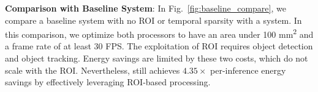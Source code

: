 \textbf{Comparison with Baseline System}: In Fig.~\ref{fig:baseline_compare}, we compare a baseline system with no ROI or temporal sparsity with a \projname{} system.
In this comparison, we optimize both processors to have an area under 100 mm\textsuperscript{2} and a frame rate of at least 30 FPS.
The exploitation of ROI requires object detection and object tracking.
Energy savings are limited by these two costs, which do not scale with the ROI.
Nevertheless, \projname{} still achieves \textbf{$4.35\times$} per-inference energy savings by effectively leveraging ROI-based processing.
